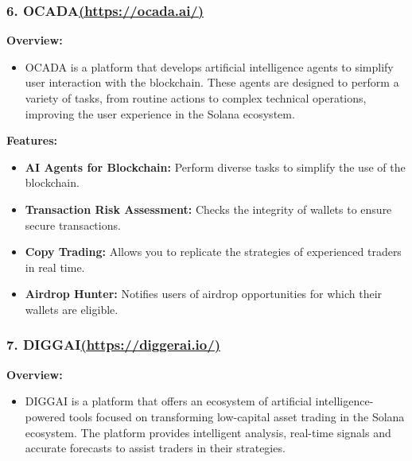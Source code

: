 \documentclass[
]{article}
\providecommand{\tightlist}{%
  \setlength{\itemsep}{0pt}\setlength{\parskip}{0pt}}
\begin{document}
\hypertarget{ocadahttpsocada.ai}{%
\subsubsection{\texorpdfstring{6.
OCADA\href{https://ocada.ai/}{(https://ocada.ai/)}}{6. OCADA(https://ocada.ai/)}}\label{ocadahttpsocada.ai}}

\textbf{Overview:}

\begin{itemize}
\tightlist
\item
  OCADA is a platform that develops artificial intelligence agents to
  simplify user interaction with the blockchain. These agents are
  designed to perform a variety of tasks, from routine actions to
  complex technical operations, improving the user experience in the
  Solana ecosystem.
\end{itemize}

\textbf{Features:}

\begin{itemize}
\tightlist
\item
  \textbf{AI Agents for Blockchain:} Perform diverse tasks to simplify
  the use of the blockchain.
\item
  \textbf{Transaction Risk Assessment:} Checks the integrity of wallets
  to ensure secure transactions.
\item
  \textbf{Copy Trading:} Allows you to replicate the strategies of
  experienced traders in real time.
\item
  \textbf{Airdrop Hunter:} Notifies users of airdrop opportunities for
  which their wallets are eligible.
\end{itemize}

\hypertarget{diggaihttpsdiggerai.io}{%
\subsubsection{\texorpdfstring{7.
DIGGAI\href{https://diggerai.io/}{(https://diggerai.io/)}}{7. DIGGAI(https://diggerai.io/)}}\label{diggaihttpsdiggerai.io}}

\textbf{Overview:}

\begin{itemize}
\tightlist
\item
  DIGGAI is a platform that offers an ecosystem of artificial
  intelligence-powered tools focused on transforming low-capital asset
  trading in the Solana ecosystem. The platform provides intelligent
  analysis, real-time signals and accurate forecasts to assist traders
  in their strategies.
\end{itemize}
\end{document}
